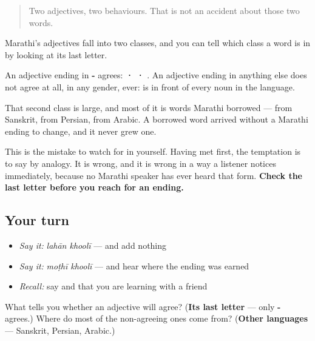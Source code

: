 \label{lesson:MR-C50-adj-invariable}



\begin{quote}
Two adjectives, two behaviours. That is not an accident about those two words.
\end{quote}

\begin{grammarlens}[title={Grammar Lens: only the -\mr{आ} adjectives agree}]
Marathi's adjectives fall into two classes, and you can tell which class a word is in by looking at its last letter.

An adjective ending in \textbf{-} agrees: \textbf{ ·  · }. An adjective ending in anything else does not agree at all, in any gender, ever: \textbf{} is \textbf{} in front of every noun in the language.

That second class is large, and most of it is words Marathi borrowed — from Sanskrit, from Persian, from Arabic. A borrowed word arrived without a Marathi ending to change, and it never grew one.

This is the mistake to watch for in yourself. Having met \textbf{} first, the temptation is to say \emph{ } by analogy. It is wrong, and it is wrong in a way a listener notices immediately, because no Marathi speaker has ever heard that form. \textbf{Check the last letter before you reach for an ending.}
\end{grammarlens}

\subsection*{Your turn}
\begin{itemize}
\raggedright
  \item \emph{Say it:} \emph{lahān khoolī} — and add nothing
  \item \emph{Say it:} \emph{moṭhī khoolī} — and hear where the ending was earned
  \item \emph{Recall:} say \textbf{} and that you are learning with a friend
\end{itemize}

\begin{tcolorbox}[breakable,colback=teal!4,colframe=teal!35!black,title={Before you move on}]
What tells you whether an adjective will agree? (\textbf{Its last letter} — only \textbf{-} agrees.) Where do most of the non-agreeing ones come from? (\textbf{Other languages} — Sanskrit, Persian, Arabic.)
\end{tcolorbox}
